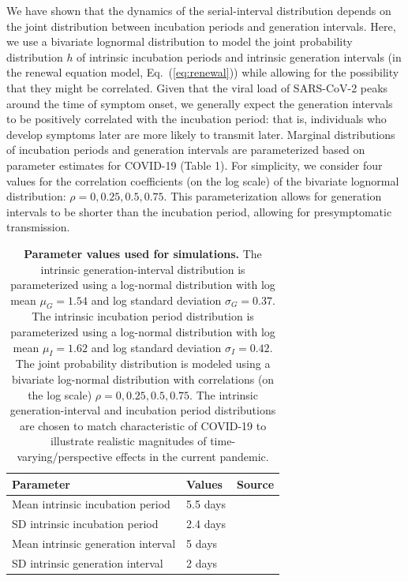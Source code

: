 \documentclass[12pt]{article}
\newcommand{\eref}[1]{Eq.~(\ref{eq:#1})}
\begin{document}
We have shown that the dynamics of the serial-interval distribution depends on the joint distribution between incubation periods and generation intervals.
Here, we use a bivariate lognormal distribution to model the joint probability distribution $h$ of intrinsic incubation periods and intrinsic generation intervals (in the renewal equation model, \eref{renewal}) while allowing for the possibility that they might be correlated.
Given that the viral load of SARS-CoV-2 peaks around the time of symptom onset, we generally expect the generation intervals to be positively correlated with the incubation period:
that is, individuals who develop symptoms later are more likely to transmit later.
Marginal distributions of incubation periods and generation intervals are parameterized based on parameter estimates for COVID-19 (Table 1).
For simplicity, we consider four values for the correlation coefficients (on the log scale) of the bivariate lognormal distribution: $\rho = 0, 0.25, 0.5, 0.75$.
This parameterization allows for generation intervals to be shorter than the incubation period, allowing for presymptomatic transmission.

\begin{table}[!ht]
\begin{center}
\begin{tabular}{|l|l|r|}
\hline
Parameter & Values & Source\\
\hline
Mean intrinsic incubation period & 5.5 days & \cite{lauer2020incubation} \\
SD intrinsic incubation period & 2.4 days & \cite{lauer2020incubation} \\
Mean intrinsic generation interval & 5 days & \cite{ferretti2020quantifying} \\
SD intrinsic generation interval & 2 days & \cite{ferretti2020quantifying} \\
\hline
\end{tabular}
\end{center}
\caption{
  \textbf{Parameter values used for simulations.}
The intrinsic generation-interval distribution is parameterized using a log-normal distribution with log mean $\mu_G=1.54$ and log standard deviation $\sigma_G=0.37$.
The intrinsic incubation period distribution is parameterized using a log-normal distribution with log mean $\mu_I=1.62$ and log standard deviation $\sigma_I=0.42$.
The joint probability distribution is modeled using a bivariate log-normal distribution with correlations (on the log scale) $\rho=0, 0.25, 0.5, 0.75$.
The intrinsic generation-interval and incubation period distributions are chosen to match characteristic of COVID-19 to illustrate realistic magnitudes of time-varying/perspective effects in the current pandemic.
}
\end{table}
\end{document}
